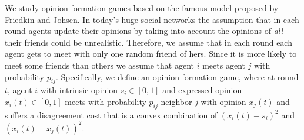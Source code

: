 



We study opinion formation games based on the famous model proposed by Friedkin
and Johsen.  In today's huge social networks the assumption that in each round
agents update their opinions by taking into account the opinions of
\emph{all} their friends could be unrealistic. Therefore, we assume that in
each round each agent gets to meet with only one random friend of
hers.  Since it is more likely to meet some friends than others we assume
that agent $i$ meets agent $j$ with probability $p_{ij}$.
Specifically, we define an opinion formation game, where at round $t$,
agent $i$ with intrinsic opinion $s_i\in[0,1]$ and expressed opinion $x_i(t)
\in[0,1]$ meets with probability $p_{ij}$ neighbor $j$ with opinion $x_j(t)$
and suffers a disagreement cost that is a convex combination of
$(x_i(t) - s_i)^2$ and $(x_i(t) - x_j(t))^2$.


